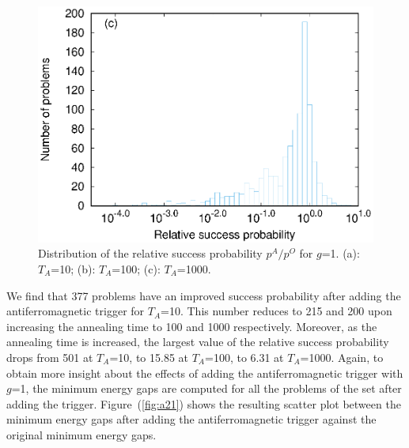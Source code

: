 \documentclass[../main.tex]{subfiles}
\begin{document}
\begin{figure}
\includegraphics[scale=0.8]{A_T1000_g1.eps}
\caption{Distribution of the relative success probability $p^A/p^O$ for $g$=1. (a): $T_A$=10; (b): $T_A$=100; (c): $T_A$=1000.}
\label{fig:a18}
\end{figure}


We find that 377 problems have an improved success probability after adding the antiferromagnetic trigger for $T_A$=10. This number reduces to 215 and 200 upon increasing the annealing time to 100 and 1000 respectively. Moreover, as the annealing time is increased, the largest value of the relative success probability drops from 501 at $T_A$=10, to 15.85 at $T_A$=100, to 6.31 at $T_A$=1000. Again, to obtain more insight about the effects of adding the antiferromagnetic trigger with $g$=1, the minimum energy gaps are computed for all the problems of the set after adding the trigger. Figure~(\ref{fig:a21}) shows the resulting scatter plot between the minimum energy gaps after adding the antiferromagnetic trigger against the original minimum energy gaps.
\end{document}
